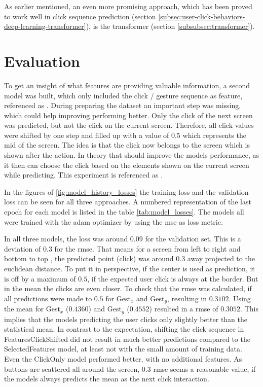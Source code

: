 As earlier mentioned, an even more promising approach, which has been proved to work well in click sequence prediction (section \ref{subsec:user-click-behaviors-deep-learning-transformer}), is the transformer (section \ref{subsubsec:transformer}).

\section{Evaluation}

To get an insight of what features are providing valuable information, a second model was built, which only included the click / gesture sequence as feature, referenced as .
During preparing the dataset an important step was missing, which could help improving performing better.
Only the click of the next screen was predicted, but not the click on the current screen.
Therefore, all click values were shifted by one step and filled up with a value of $0.5$ which represents the mid of the screen.
The idea is that the click now belongs to the screen which is shown after the action.
In theory that should improve the models performance, as it then can choose the click based on the elements shown on the current screen while predicting.
This experiment is referenced as .

In the figures of \ref{fig:model_history_losses} the training loss and the validation loss can be seen for all three approaches.
A numbered representation of the last epoch for each model is listed in the table \ref{tab:model_losses}.
The models all were trained with the \gls{adam} optimizer by using the \gls{mse} as loss metric.

In all three models, the loss was around 0.09 for the validation set.
This is a deviation of 0.3 for the \gls{rmse}.
That means for a screen from left  to right  and bottom  to top , the predicted point (click) was around $0.3$ away projected to the euclidean distance.
To put it in perspective, if the center is used as prediction, it is off by a maximum of $0.5$, if the expected user click is always at the border.
But in the mean the clicks are even closer.
To check that the \gls{rmse} was calculated, if all predictions were made to $0.5$ for Gest$_x$ and Gest$_y$, resulting in $0.3102$.
Using the mean for Gest$_x$ ($0.4360$) and Gest$_y$ ($0.4552$) resulted in a \gls{rmse} of $0.3052$.
This implies that the models predicting the user clicks only slightly better than the statistical mean.
In contrast to the expectation, shifting the click sequence in FeaturesClickShifted did not result in much better predictions compared to the SelectedFeatures model, at least not with the small amount of training data.
Even the ClickOnly model performed better, with no additional features.
As buttons are scattered all around the screen, $0.3$ \gls{rmse} seems a reasonable value, if the models always predicts the mean as the next click interaction.

